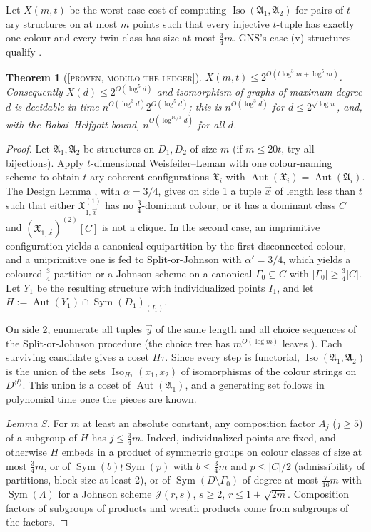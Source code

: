 \documentclass[11pt]{article}
\newtheorem{theorem}{Theorem}[section]
\theoremstyle{definition}
\theoremstyle{remark}
\newcommand{\Sym}{\operatorname{Sym}}
\newcommand{\Aut}{\operatorname{Aut}}
\newcommand{\Iso}{\operatorname{Iso}}
\newcommand{\fA}{\mathfrak A}
\newcommand{\fX}{\mathfrak X}
\newcommand{\ProvenM}{\textsc{[proven, modulo the ledger]}}
\begin{document}
Let $X(m,t)$ be the worst-case cost of computing $\Iso(\fA_1,\fA_2)$ for pairs of $t$-ary structures on at most $m$ points such that every injective $t$-tuple has exactly one colour and every twin class has size at most $\tfrac34 m$. GNS's case-(v) structures qualify \cite[proof of Lemma~6.6]{GNS}.

\begin{theorem}[\ProvenM]\label{thm:X}
$X(m,t)\le 2^{O(t\log^3 m+\log^5 m)}$. Consequently $X(d)\le 2^{O(\log^5 d)}$ and isomorphism of graphs of maximum degree $d$ is decidable in time $n^{O(\log^3 d)}2^{O(\log^5 d)}$; this is $n^{O(\log^3 d)}$ for $d\le 2^{\sqrt{\log n}}$, and, with the Babai--Helfgott bound, $n^{O(\log^{10/3}d)}$ for all $d$.
\end{theorem}

\begin{proof}
Let $\fA_1,\fA_2$ be structures on $D_1,D_2$ of size $m$ (if $m\le 20t$, try all bijections). Apply $t$-dimensional Weisfeiler--Leman with one colour-naming scheme to obtain $t$-ary coherent configurations $\fX_i$ with $\Aut(\fX_i)=\Aut(\fA_i)$. The Design Lemma \cite[Prop.~\texttt{design}]{HBD}, with $\alpha=3/4$, gives on side 1 a tuple $\vec x$ of length less than $t$ such that either $\fX_{1,\vec x}^{(1)}$ has no $\tfrac34$-dominant colour, or it has a dominant class $C$ and $(\fX_{1,\vec x})^{(2)}[C]$ is not a clique. In the second case, an imprimitive configuration yields a canonical equipartition by the first disconnected colour, and a uniprimitive one is fed to Split-or-Johnson with $\alpha'=3/4$, which yields a coloured $\tfrac34$-partition or a Johnson scheme on a canonical $\Gamma_0\subseteq C$ with $|\Gamma_0|\ge\tfrac34|C|$. Let $Y_1$ be the resulting structure with individualized points $I_1$, and let $H:=\Aut(Y_1)\cap\Sym(D_1)_{(I_1)}$.

On side 2, enumerate all tuples $\vec y$ of the same length and all choice sequences of the Split-or-Johnson procedure (the choice tree has $m^{O(\log m)}$ leaves \cite{HBD}). Each surviving candidate gives a coset $H\tau$. Since every step is functorial, $\Iso(\fA_1,\fA_2)$ is the union of the sets $\Iso_{H\tau}(x_1,x_2)$ of isomorphisms of the colour strings on $D^{\langle t\rangle}$. This union is a coset of $\Aut(\fA_1)$, and a generating set follows in polynomial time once the pieces are known.

\emph{Lemma S.} For $m$ at least an absolute constant, any composition factor $A_j$ ($j\ge5$) of a subgroup of $H$ has $j\le\tfrac34 m$. Indeed, individualized points are fixed, and otherwise $H$ embeds in a product of symmetric groups on colour classes of size at most $\tfrac34m$, or of $\Sym(b)\wr\Sym(p)$ with $b\le\tfrac34m$ and $p\le|C|/2$ (admissibility of partitions, block size at least 2), or of $\Sym(D\setminus\Gamma_0)$ of degree at most $\tfrac7{16}m$ with $\Sym(\Lambda)$ for a Johnson scheme $\mathcal J(r,s)$, $s\ge 2$, $r\le1+\sqrt{2m}$. Composition factors of subgroups of products and wreath products come from subgroups of the factors.


\end{proof}
\end{document}
